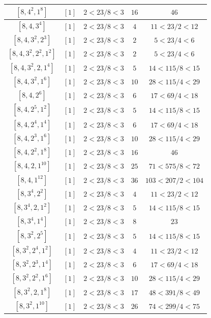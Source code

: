 \documentclass{article}%
\begin{document}
\begin{center}
\begin{longtable}{||c|c|c|c|c||}
$[8, 4^{2}, 1^{8}]$ & $[1]$ & $2 < 23/8 < 3$ & $16$ & $46$ \\ \hline 
$[8, 4, 3^{4}]$ & $[1]$ & $2 < 23/8 < 3$ & $4$ & $11 < 23/2 < 12$ \\ \hline 
$[8, 4, 3^{2}, 2^{3}]$ & $[1]$ & $2 < 23/8 < 3$ & $2$ & $5 < 23/4 < 6$ \\ \hline 
$[8, 4, 3^{2}, 2^{2}, 1^{2}]$ & $[1]$ & $2 < 23/8 < 3$ & $2$ & $5 < 23/4 < 6$ \\ \hline 
$[8, 4, 3^{2}, 2, 1^{4}]$ & $[1]$ & $2 < 23/8 < 3$ & $5$ & $14 < 115/8 < 15$ \\ \hline 
$[8, 4, 3^{2}, 1^{6}]$ & $[1]$ & $2 < 23/8 < 3$ & $10$ & $28 < 115/4 < 29$ \\ \hline 
$[8, 4, 2^{6}]$ & $[1]$ & $2 < 23/8 < 3$ & $6$ & $17 < 69/4 < 18$ \\ \hline 
$[8, 4, 2^{5}, 1^{2}]$ & $[1]$ & $2 < 23/8 < 3$ & $5$ & $14 < 115/8 < 15$ \\ \hline 
$[8, 4, 2^{4}, 1^{4}]$ & $[1]$ & $2 < 23/8 < 3$ & $6$ & $17 < 69/4 < 18$ \\ \hline 
$[8, 4, 2^{3}, 1^{6}]$ & $[1]$ & $2 < 23/8 < 3$ & $10$ & $28 < 115/4 < 29$ \\ \hline 
$[8, 4, 2^{2}, 1^{8}]$ & $[1]$ & $2 < 23/8 < 3$ & $16$ & $46$ \\ \hline 
$[8, 4, 2, 1^{10}]$ & $[1]$ & $2 < 23/8 < 3$ & $25$ & $71 < 575/8 < 72$ \\ \hline 
$[8, 4, 1^{12}]$ & $[1]$ & $2 < 23/8 < 3$ & $36$ & $103 < 207/2 < 104$ \\ \hline 
$[8, 3^{4}, 2^{2}]$ & $[1]$ & $2 < 23/8 < 3$ & $4$ & $11 < 23/2 < 12$ \\ \hline 
$[8, 3^{4}, 2, 1^{2}]$ & $[1]$ & $2 < 23/8 < 3$ & $5$ & $14 < 115/8 < 15$ \\ \hline 
$[8, 3^{4}, 1^{4}]$ & $[1]$ & $2 < 23/8 < 3$ & $8$ & $23$ \\ \hline 
$[8, 3^{2}, 2^{5}]$ & $[1]$ & $2 < 23/8 < 3$ & $5$ & $14 < 115/8 < 15$ \\ \hline 
$[8, 3^{2}, 2^{4}, 1^{2}]$ & $[1]$ & $2 < 23/8 < 3$ & $4$ & $11 < 23/2 < 12$ \\ \hline 
$[8, 3^{2}, 2^{3}, 1^{4}]$ & $[1]$ & $2 < 23/8 < 3$ & $6$ & $17 < 69/4 < 18$ \\ \hline 
$[8, 3^{2}, 2^{2}, 1^{6}]$ & $[1]$ & $2 < 23/8 < 3$ & $10$ & $28 < 115/4 < 29$ \\ \hline 
$[8, 3^{2}, 2, 1^{8}]$ & $[1]$ & $2 < 23/8 < 3$ & $17$ & $48 < 391/8 < 49$ \\ \hline 
$[8, 3^{2}, 1^{10}]$ & $[1]$ & $2 < 23/8 < 3$ & $26$ & $74 < 299/4 < 75$ \\ \hline 

\end{longtable}
\end{center}
\end{document}
